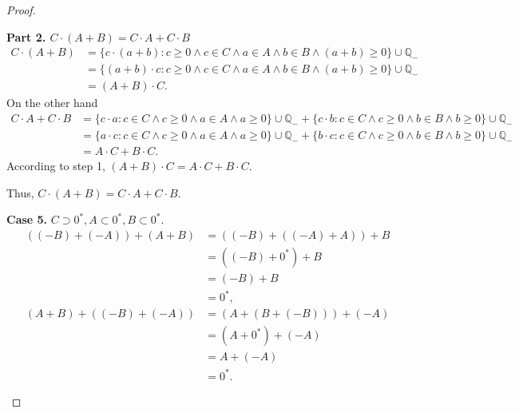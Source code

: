 \begin{proof}
\begin{enumerate}[label={(F\arabic*)}, start=5]
              \textbf{Part 2. $C\cdot (A + B) = C\cdot A + C\cdot B$}
              \begin{align*}
                  C\cdot (A + B) & = \{ c\cdot (a + b) : c\ge 0\land c\in C\land a\in A\land b\in B\land (a+b)\ge 0 \}\cup\mathbb{Q}_{-} \\
                                 & = \{ (a + b)\cdot c : c\ge 0\land c\in C\land a\in A\land b\in B\land (a+b)\ge 0 \}\cup\mathbb{Q}_{-} \\
                                 & = (A + B)\cdot C.
              \end{align*}
              On the other hand
              \begin{align*}
                  C\cdot A + C\cdot B & = \{ c\cdot a : c\in C\land c\ge 0\land a\in A\land a\ge 0 \}\cup\mathbb{Q}_{-} + \{ c\cdot b :  c\in C\land c\ge 0\land b\in B\land b\ge 0 \}\cup\mathbb{Q}_{-} \\
                                      & = \{ a\cdot c : c\in C\land c\ge 0\land a\in A\land a\ge 0 \}\cup\mathbb{Q}_{-} + \{ b\cdot c :  c\in C\land c\ge 0\land b\in B\land b\ge 0 \}\cup\mathbb{Q}_{-} \\
                                      & = A\cdot C + B\cdot C.
              \end{align*}
              According to step 1, $(A + B)\cdot C = A\cdot C + B\cdot C$.

              Thus, $C\cdot (A + B) = C\cdot A + C\cdot B$.

              \textbf{Case 5.} $C\supset {0}^{*}, A\subset {0}^{*}, B\subset {0}^{*}$.
              \begin{align*}
                  ((-B) + (-A)) + (A + B) & = ((-B) + ((-A) + A)) + B \\
                                          & = ((-B) + {0}^{*}) + B    \\
                                          & = (-B) + B                \\
                                          & = {0}^{*},                \\
                  (A + B) + ((-B) + (-A)) & = (A + (B + (-B))) + (-A) \\
                                          & = (A + {0}^{*}) + (-A)    \\
                                          & = A + (-A)                \\
                                          & = {0}^{*}.
              \end{align*}


\end{enumerate}
\end{proof}

